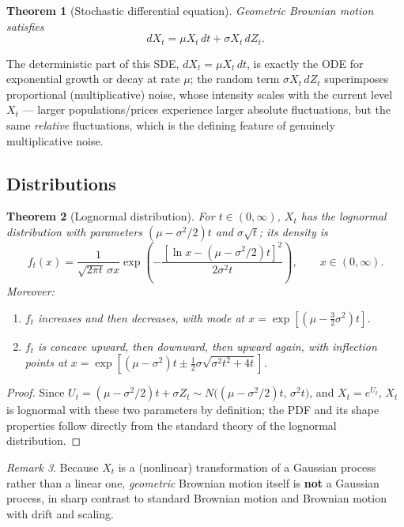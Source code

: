\documentclass[12pt,openany]{book}
\newtheorem{theorem}{Theorem}[section]
\theoremstyle{definition}
\theoremstyle{remark}
\newtheorem{remark}[theorem]{Remark}
\begin{document}
\begin{theorem}[Stochastic differential equation]
Geometric Brownian motion satisfies
\begin{equation}
    dX_t = \mu X_t\,dt + \sigma X_t\,dZ_t. \tag{18.4.3}
\end{equation}
\end{theorem}
 
The deterministic part of this SDE, $dX_t = \mu X_t\,dt$, is exactly the ODE for exponential growth or decay at rate $\mu$; the random term $\sigma X_t\,dZ_t$ superimposes proportional (multiplicative) noise, whose intensity scales with the current level $X_t$ — larger populations/prices experience larger absolute fluctuations, but the same \emph{relative} fluctuations, which is the defining feature of genuinely multiplicative noise.
 
\subsection{Distributions}
 
\begin{theorem}[Lognormal distribution]
For $t\in(0,\infty)$, $X_t$ has the \emph{lognormal distribution} with parameters $(\mu-\sigma^2/2)t$ and $\sigma\sqrt t$; its density is
\begin{equation}
    f_t(x) = \frac{1}{\sqrt{2\pi t}\,\sigma x}\exp\!\left(-\frac{[\ln x - (\mu-\sigma^2/2)t]^2}{2\sigma^2 t}\right), \qquad x\in(0,\infty). \tag{18.4.4}
\end{equation}
Moreover:
\begin{enumerate}[label=(\arabic*)]
    \item $f_t$ increases and then decreases, with mode at $x = \exp[(\mu-\tfrac32\sigma^2)t]$.
    \item $f_t$ is concave upward, then downward, then upward again, with inflection points at $x=\exp\!\left[(\mu-\sigma^2)t \pm \tfrac12\sigma\sqrt{\sigma^2t^2+4t}\right]$.
\end{enumerate}
\end{theorem}
\begin{proof}
Since $U_t = (\mu-\sigma^2/2)t + \sigma Z_t \sim N\big((\mu-\sigma^2/2)t,\, \sigma^2t\big)$, and $X_t = e^{U_t}$, $X_t$ is lognormal with these two parameters by definition; the PDF and its shape properties follow directly from the standard theory of the lognormal distribution.
\end{proof}
 
\begin{remark}
Because $X_t$ is a (nonlinear) transformation of a Gaussian process rather than a linear one, \emph{geometric} Brownian motion itself is \textbf{not} a Gaussian process, in sharp contrast to standard Brownian motion and Brownian motion with drift and scaling.
\end{remark}
 
\end{document}
